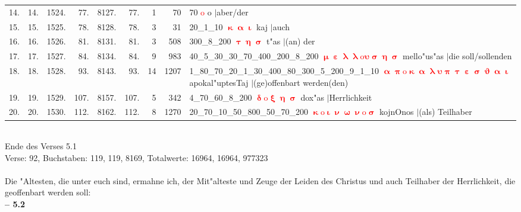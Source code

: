 \documentclass[a4paper,10pt,landscape]{article}
\begin{document}
\begin{tabular}{rrrrrrrrp{120mm}}
14.&14.&1524.&77.&8127.&77.&1&70&70 \textcolor{red}{$\boldsymbol{\mathrm{o}}$} o $|$aber/der\\
15.&15.&1525.&78.&8128.&78.&3&31&20\_1\_10 \textcolor{red}{$\boldsymbol{\upkappa\upalpha\upiota}$} kaj $|$auch\\
16.&16.&1526.&81.&8131.&81.&3&508&300\_8\_200 \textcolor{red}{$\boldsymbol{\uptau\upeta\upsigma}$} t"as $|$(an) der\\
17.&17.&1527.&84.&8134.&84.&9&983&40\_5\_30\_30\_70\_400\_200\_8\_200 \textcolor{red}{$\boldsymbol{\upmu\upepsilon\uplambda\uplambda\mathrm{o}\upsilon\upsigma\upeta\upsigma}$} mello"us"as $|$die soll/sollenden\\
18.&18.&1528.&93.&8143.&93.&14&1207&1\_80\_70\_20\_1\_30\_400\_80\_300\_5\_200\_9\_1\_10 \textcolor{red}{$\boldsymbol{\upalpha\uppi\mathrm{o}\upkappa\upalpha\uplambda\upsilon\uppi\uptau\upepsilon\upsigma\upvartheta\upalpha\upiota}$} apokal"uptesTaj $|$(ge)offenbart werden(den)\\
19.&19.&1529.&107.&8157.&107.&5&342&4\_70\_60\_8\_200 \textcolor{red}{$\boldsymbol{\updelta\mathrm{o}\upxi\upeta\upsigma}$} dox"as $|$Herrlichkeit\\
20.&20.&1530.&112.&8162.&112.&8&1270&20\_70\_10\_50\_800\_50\_70\_200 \textcolor{red}{$\boldsymbol{\upkappa\mathrm{o}\upiota\upnu\upomega\upnu\mathrm{o}\upsigma}$} kojnOnos $|$(als) Teilhaber\\
\end{tabular}\medskip \\
Ende des Verses 5.1\\
Verse: 92, Buchstaben: 119, 119, 8169, Totalwerte: 16964, 16964, 977323\\
\\
Die "Altesten, die unter euch sind, ermahne ich, der Mit"alteste und Zeuge der Leiden des Christus und auch Teilhaber der Herrlichkeit, die geoffenbart werden soll:\\
\newpage 
{\bf -- 5.2}\\
\medskip \\
\end{document}
